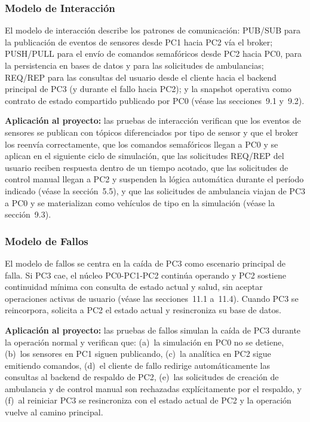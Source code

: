 \documentclass[12pt, a4paper]{article}
\let\oldtexttt\texttt
\renewcommand{\texttt}[1]{\oldtexttt{\seqsplit{#1}}}
\begin{document}
\subsubsection{Modelo de Interacción}

El modelo de interacción describe los patrones de comunicación: PUB/SUB para la publicación de eventos de sensores desde PC1 hacia PC2 vía el broker; PUSH/PULL para el envío de comandos semafóricos desde PC2 hacia PC0, para la persistencia en bases de datos y para las solicitudes de ambulancias; REQ/REP para las consultas del usuario desde el cliente hacia el backend principal de PC3 (y durante el fallo hacia PC2); y la snapshot operativa como contrato de estado compartido publicado por PC0 (véase las secciones~9.1 y~9.2).

\textbf{Aplicación al proyecto:} las pruebas de interacción verifican que los eventos de sensores se publican con tópicos diferenciados por tipo de sensor y que el broker los reenvía correctamente, que los comandos semafóricos llegan a PC0 y se aplican en el siguiente ciclo de simulación, que las solicitudes REQ/REP del usuario reciben respuesta dentro de un tiempo acotado, que las solicitudes de control manual llegan a PC2 y suspenden la lógica automática durante el período indicado (véase la sección~5.5), y que las solicitudes de ambulancia viajan de PC3 a PC0 y se materializan como vehículos de tipo \texttt{AMBULANCIA} en la simulación (véase la sección~9.3).

\subsubsection{Modelo de Fallos}

El modelo de fallos se centra en la caída de PC3 como escenario principal de falla. Si PC3 cae, el núcleo PC0-PC1-PC2 continúa operando y PC2 sostiene continuidad mínima con consulta de estado actual y salud, sin aceptar operaciones activas de usuario (véase las secciones~11.1 a~11.4). Cuando PC3 se reincorpora, solicita a PC2 el estado actual y resincroniza su base de datos.

\textbf{Aplicación al proyecto:} las pruebas de fallos simulan la caída de PC3 durante la operación normal y verifican que: (a)~la simulación en PC0 no se detiene, (b)~los sensores en PC1 siguen publicando, (c)~la analítica en PC2 sigue emitiendo comandos, (d)~el cliente de fallo redirige automáticamente las consultas al backend de respaldo de PC2, (e)~las solicitudes de creación de ambulancia y de control manual son rechazadas explícitamente por el respaldo, y (f)~al reiniciar PC3 se resincroniza con el estado actual de PC2 y la operación vuelve al camino principal.
\end{document}
